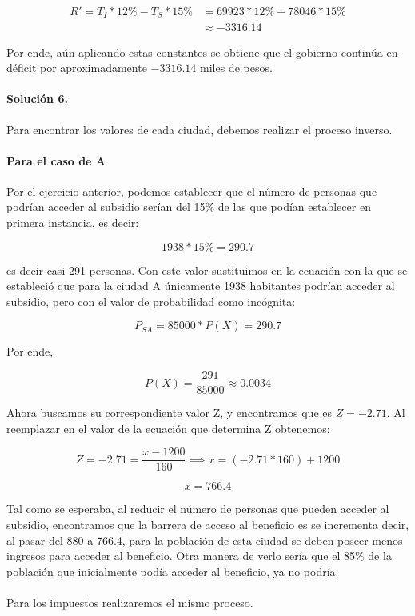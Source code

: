 \documentclass{article}
\begin{document}
\begin{align*}
	R' = T_{I} * 12\%  - T_{S} * 15\% &= 69923*12\% - 78046 * 15\%\\
	&\approx -3316.14 
\end{align*}

Por ende, aún aplicando estas constantes se obtiene que el gobierno continúa en déficit por aproximadamente $-3316.14$ miles de pesos.

\paragraph{Solución 6.} Para encontrar los valores de cada ciudad, debemos realizar el proceso inverso.

\paragraph{Para el caso de A} Por el ejercicio anterior, podemos establecer que el número de personas que podrían acceder al subsidio serían del 15\% de las que podían establecer en primera instancia, es decir:

$$1938*15\% = 290.7 $$

es decir casi 291 personas. Con este valor sustituimos en la ecuación con la que se estableció que para la ciudad A únicamente 1938 habitantes podrían acceder al subsidio, pero con el valor de probabilidad como incógnita:

$$P_{SA} = 85000 * P(X) = 290.7$$

Por ende,

$$P(X) = \frac{291}{85000} \approx 0.0034$$

Ahora buscamos su correspondiente valor Z, y encontramos que es $Z = -2.71$. Al reemplazar en el valor de la ecuación que determina Z obtenemos:

$$Z=-2.71 = \frac{x-1200}{160} \implies x = (-2.71*160) + 1200$$

$$ x = 766.4$$

Tal como se esperaba, al reducir el número de personas que pueden acceder al subsidio, encontramos que la barrera de acceso al beneficio es se incrementa decir, al pasar del 880 a 766.4, para la población de esta ciudad se deben poseer menos ingresos para acceder al beneficio. Otra manera de verlo sería que el 85\% de la población que inicialmente podía acceder al beneficio, ya no podría.

\paragraph{} Para los impuestos realizaremos el mismo proceso.
\end{document}
